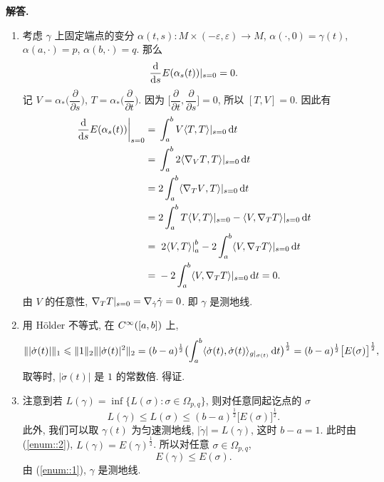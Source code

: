 \documentclass{ctexart}
\newenvironment{solution}{\par\noindent\textbf{解答. }}{\par}
\begin{document}
\begin{solution}
    \newcommand{\dgam}{\dot{\gamma}}
    \begin{enumerate}
        \item 考虑 $\gamma$ 上固定端点的变分 $\alpha(t, s) \colon M \times (-\varepsilon, \varepsilon) \rightarrow M$, $\alpha(\cdot, 0) = \gamma(t)$, $\alpha(a, \cdot) = p$, $\alpha(b, \cdot) = q$. 那么
        \[
            \dfrac{\mathop{}\!\mathrm{d} }{\mathop{}\!\mathrm{d} s}E(\alpha_s(t))|_{s = 0} = 0.
        \]
        记 $V = \alpha_{\ast}\bigl( \dfrac{\partial}{\partial s} \bigr)$, $T = \alpha_{\ast}\bigl( \dfrac{\partial}{\partial t} \bigr)$. 因为 $\bigl[\dfrac{\partial}{\partial t} , \dfrac{\partial}{\partial s}\bigr] = 0$, 所以 $[T, V] = 0$. 因此有
        \[
            \begin{aligned}
                \left. \dfrac{\dif }{\dif s}E(\alpha_s(t)) \right|_{s = 0} ={} & 
                \int_{a}^{b} V\Inner{T}{T}|_{s = 0} \dif t \\
                ={} & \int_{a}^{b} 2\Inner{\Div{V}T }{T}|_{s = 0} \dif t \\
                ={} & 2\int_{a}^{b} \Inner{\Div{T}V}{T}|_{s = 0} \dif t \\
                ={} & 2\int_{a}^{b} T\Inner{V}{T}|_{s = 0} - \Inner{V}{\Div{T}T}|_{s = 0} \dif t \\
                ={} & \left.2\Inner{V}{T}\right|^{b}_{a} - 2\int_{a}^{b}\Inner{V}{\Div{T}T}|_{s = 0} \dif t \\
                ={} & - 2\int_{a}^{b}\Inner{V}{\Div{T}T}|_{s = 0} \dif t = 0.
            \end{aligned}
        \]
        由 $V$ 的任意性, $\Div{T}T|_{s = 0} = \Div{\dgam}\dgam = 0$. 即 $\gamma$ 是测地线.
        \item 用 H\"older 不等式, 在 $C^{\infty}([a, b])$ 上,
        \[
            \Vert {|\dot{\sigma}(t)|} \Vert_{1} \leqslant \Vert {1} \Vert_{2} \Vert {|\dot{\sigma}(t)|^2} \Vert_{2} = (b - a)^{\frac{1}{2}}\bigl(\int_{a}^{b}\langle {\dot{\sigma}(t)}, {\dot{\sigma}(t)} \rangle_{g|_{\sigma(t)}} \mathop{}\!\mathrm{d} t\bigr)^{\frac{1}{2}} = (b - a)^{\frac{1}{2}}\bigl[E(\sigma)\bigr]^{\frac{1}{2}},
        \]
        取等时, $|\dot{\sigma}(t)|$ 是 $1$ 的常数倍. 得证.
        \item 注意到若 $L(\gamma) = \inf\{L(\sigma) \colon \sigma \in \Omega_{p, q}\}$, 则对任意同起讫点的 $\sigma$
        \[
            L(\gamma) \leqslant L(\sigma) \leqslant (b - a)^{\frac{1}{2}}\bigl[E(\sigma)\bigr]^{\frac{1}{2}}.
        \]
        此外, 我们可以取 $\gamma(t)$ 为匀速测地线, $|\dgam| = L(\gamma)$, 这时 $b - a = 1$. 此时由 (\ref{enum::2}), $L(\gamma) = E(\gamma)^{\frac{1}{2}}$. 所以对任意 $\sigma \in \Omega_{p, q}$,
        \[
            E(\gamma) \leqslant E(\sigma).
        \]
        由 (\ref{enum::1}), $\gamma$ 是测地线.
    \end{enumerate}
\end{solution}
\end{document}
